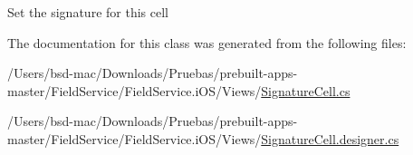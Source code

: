 Set the signature for this cell 



The documentation for this class was generated from the following files\+:\begin{DoxyCompactItemize}
\item 
/\+Users/bsd-\/mac/\+Downloads/\+Pruebas/prebuilt-\/apps-\/master/\+Field\+Service/\+Field\+Service.\+i\+O\+S/\+Views/\hyperlink{_signature_cell_8cs}{Signature\+Cell.\+cs}\item 
/\+Users/bsd-\/mac/\+Downloads/\+Pruebas/prebuilt-\/apps-\/master/\+Field\+Service/\+Field\+Service.\+i\+O\+S/\+Views/\hyperlink{_signature_cell_8designer_8cs}{Signature\+Cell.\+designer.\+cs}\end{DoxyCompactItemize}
